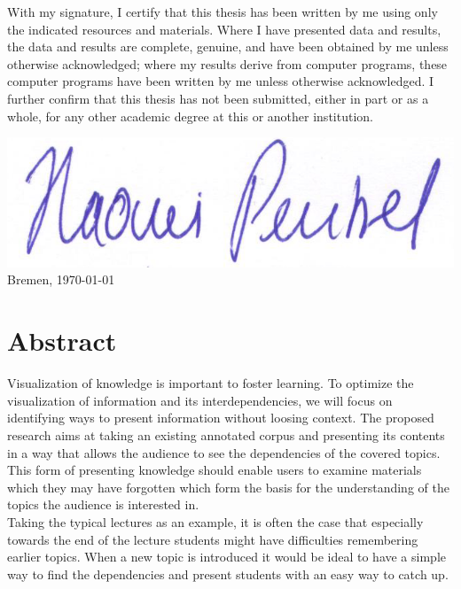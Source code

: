 \documentclass[twoside]{article}
\begin{document}
\newpage
\noindent
  With my signature, I certify that this thesis has been written by me
  using only the indicated resources and materials. Where I have
  presented data and results, the data and results are complete,
  genuine, and have been obtained by me unless otherwise acknowledged;
  where my results derive from computer programs, these computer
  programs have been written by me unless otherwise acknowledged. I
  further confirm that this thesis has not been submitted, either in
  part or as a whole, for any other academic degree at this or another
  institution.

  \vspace{20mm}

    \includegraphics[scale=0.2]{assets/Signature}
 \hfill Bremen, \today
  
\newpage

\thispagestyle{fancy} %


 \section*{Abstract}
 \label{sec:abstract}
Visualization of knowledge is important to foster learning. To optimize the visualization of information and its interdependencies, we will focus on identifying ways to present information without loosing context. The proposed research aims at taking an existing annotated corpus and presenting its contents in a way that allows the audience to see the dependencies of the covered topics. This form of presenting knowledge should enable users to examine materials which they may have forgotten which form the basis for the understanding of the topics the audience is interested in.\\

Taking the typical lectures as an example, it is often the case that especially towards the end of the lecture students might have difficulties remembering earlier topics. When a new topic is introduced it would be ideal to have a simple way to find the dependencies and present students with an easy way to catch up.\\
\end{document}
